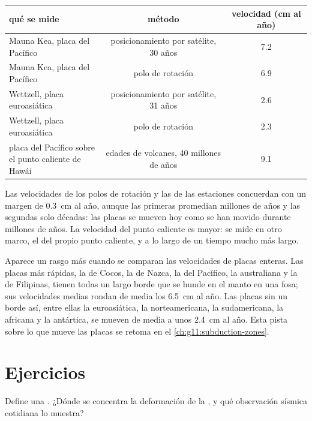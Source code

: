 \begin{center}
\small
\begin{tabular}{|l|c|c|}
\hline
qué se mide & método & velocidad (\unit{cm} al año) \\ \hline
Mauna Kea, placa del Pacífico & posicionamiento por satélite, 30 años & 7.2 \\
Mauna Kea, placa del Pacífico & polo de rotación & 6.9 \\
Wettzell, placa euroasiática & posicionamiento por satélite, 31 años & 2.6 \\
Wettzell, placa euroasiática & polo de rotación & 2.3 \\
\shortstack[l]{placa del Pacífico sobre\\el punto caliente de Hawái} & edades de volcanes, 40 millones de años & 9.1 \\ \hline
\end{tabular}
\end{center}

Las velocidades de los polos de rotación y las de las estaciones concuerdan
con un margen de \qty{0.3}{cm} al año, aunque las primeras promedian millones
de años y las segundas solo décadas: las placas se mueven hoy como se han
movido durante millones de años. La velocidad del punto caliente es mayor:
se mide en otro marco, el del propio punto caliente, y a lo largo de un
tiempo mucho más largo.

Aparece un rasgo más cuando se comparan las velocidades de placas enteras.
Las placas más rápidas, la de Cocos, la de Nazca, la del Pacífico, la
australiana y la de Filipinas, tienen todas un largo borde que se hunde en el
manto en una fosa; sus velocidades medias rondan de media los
\qty{6.5}{cm} al año. Las placas sin un borde así, entre ellas la
euroasiática, la norteamericana, la sudamericana, la africana y la antártica,
se mueven de media a unos \qty{2.4}{cm} al año. Esta pista sobre lo que mueve
las placas se retoma en el \cref{ch:g11:subduction-zones}.

\section{Ejercicios}

\begin{exercise}[$\star$]\label{exo:g11:plate-motions:1}
Define una . ¿Dónde se concentra la deformación de la ,
y qué observación sísmica cotidiana lo muestra?
\end{exercise}

